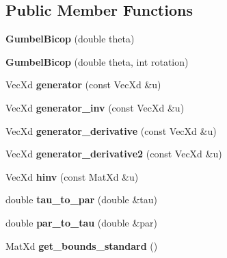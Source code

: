 \subsection*{Public Member Functions}
\begin{DoxyCompactItemize}
\item 
\hypertarget{class_gumbel_bicop_ab600aa2b30842d53add614f9c6617a4b}{{\bfseries Gumbel\+Bicop} (double theta)}\label{class_gumbel_bicop_ab600aa2b30842d53add614f9c6617a4b}

\item 
\hypertarget{class_gumbel_bicop_ae7f587608099dffb95e189609353e38a}{{\bfseries Gumbel\+Bicop} (double theta, int rotation)}\label{class_gumbel_bicop_ae7f587608099dffb95e189609353e38a}

\item 
\hypertarget{class_gumbel_bicop_a7462d2e917ed8f9c7c768bc763062000}{Vec\+Xd {\bfseries generator} (const Vec\+Xd \&u)}\label{class_gumbel_bicop_a7462d2e917ed8f9c7c768bc763062000}

\item 
\hypertarget{class_gumbel_bicop_a1aac5fc1926ebb1a7a5477fea8eafc4e}{Vec\+Xd {\bfseries generator\+\_\+inv} (const Vec\+Xd \&u)}\label{class_gumbel_bicop_a1aac5fc1926ebb1a7a5477fea8eafc4e}

\item 
\hypertarget{class_gumbel_bicop_a04ad137cdb969fdcb38141dd55cc08ca}{Vec\+Xd {\bfseries generator\+\_\+derivative} (const Vec\+Xd \&u)}\label{class_gumbel_bicop_a04ad137cdb969fdcb38141dd55cc08ca}

\item 
\hypertarget{class_gumbel_bicop_ab86b728ad0f0db50711e25defc39a1ad}{Vec\+Xd {\bfseries generator\+\_\+derivative2} (const Vec\+Xd \&u)}\label{class_gumbel_bicop_ab86b728ad0f0db50711e25defc39a1ad}

\item 
\hypertarget{class_gumbel_bicop_a33500ea02a83efb50cf1d5e6f32b928a}{Vec\+Xd {\bfseries hinv} (const Mat\+Xd \&u)}\label{class_gumbel_bicop_a33500ea02a83efb50cf1d5e6f32b928a}

\item 
\hypertarget{class_gumbel_bicop_ab1c5ed2bd052ff2f8a4f544cc213d62c}{double {\bfseries tau\+\_\+to\+\_\+par} (double \&tau)}\label{class_gumbel_bicop_ab1c5ed2bd052ff2f8a4f544cc213d62c}

\item 
\hypertarget{class_gumbel_bicop_a6a0b1e1a8dcf0f7d297f222ad3637337}{double {\bfseries par\+\_\+to\+\_\+tau} (double \&par)}\label{class_gumbel_bicop_a6a0b1e1a8dcf0f7d297f222ad3637337}

\item 
\hypertarget{class_gumbel_bicop_a05d34b9099cbb0a759604f2ad4b78d49}{Mat\+Xd {\bfseries get\+\_\+bounds\+\_\+standard} ()}\label{class_gumbel_bicop_a05d34b9099cbb0a759604f2ad4b78d49}

\end{DoxyCompactItemize}
